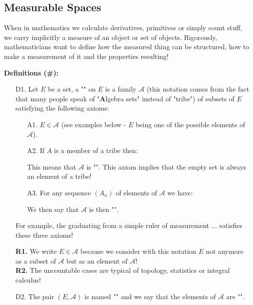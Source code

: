 	\subsection{Measurable Spaces}
	When in mathematics we calculate derivatives, primitives or simply count stuff, we carry implicitly a measure of an object or set of objects. Rigorously, mathematicians want to define how the measured thing can be structured, how to make a measurement of it and the properties resulting!
	
	\textbf{Definitions (\#\mydef):}
	\begin{enumerate}
		\item[D1.] Let $E$ be a set, a "" on $E$ is a family $\mathcal{A}$ (this notation comes from the fact that many people speak of "\textbf{A}lgebra sets" instead of "tribe") of subsets of $E$ satisfying the following axioms:
		\begin{enumerate}
			\item[A1.] $E\in \mathcal{A}$ (see examples below - $E$ being one of the possible elements of $\mathcal{A}$).
			
			\item[A2.]  If $A$ is a member of a tribe then:
			
			This means that $\mathcal{A} $ is "". This axiom implies that the empty set is always an element of a tribe!
			
			\item[A3.] For any sequence $(A_n)$ of elements of $\mathcal{A}$ we have:
			
			 We then say that $\mathcal{A}$ is then "".
		\end{enumerate}
		For example, the graduating from a simple ruler of measurement ... satisfies these three axioms!
	\begin{tcolorbox}[title=Remarks,colframe=black,arc=10pt]
	\textbf{R1.} We write $E\in \mathcal{A}$ because we consider with this notation $E$ not anymore as a subset of $\mathcal{A}$  but as an element of $\mathcal{A}$!\\
	
	\textbf{R2.} The uncountable cases are typical of topology, statistics or integral calculus!
	\end{tcolorbox}	
	
	\item[D2.] The pair $(E,\mathcal{A})$ is named "" and we say that the elements of $\mathcal{A}$ are "".
	

\end{enumerate}
